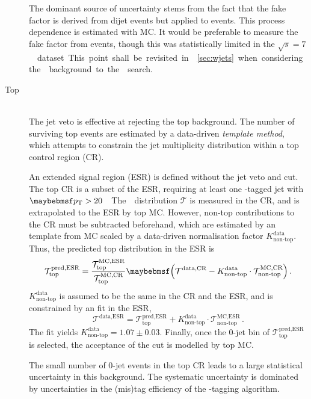 \begin{description}
	The dominant source of uncertainty stems from the fact that the fake factor is 
	derived from dijet events but applied to \Wjets events. This process dependence is 
	estimated with MC. It would be preferable to measure the fake factor from \Zjets 
	events, though this was statistically limited in the \unit{$\sqrt{s} = 7$}{\TeV} 
	dataset. This point shall be revisited in \Section~\ref{sec:wjets} when considering 
	the \Wjets background to the \HWW search.

\item[Top] \hfill \\
	The jet veto is effective at rejecting the top background. The number of surviving 
	top events are estimated by a data-driven \textit{template method}, which attempts to 
	constrain the jet multiplicity distribution within a top control region (CR).

	An extended signal region (ESR) is defined without the jet veto and \ptll cut. The 
	top CR is a subset of the ESR, requiring at least one \Pbottom-tagged jet with 
	\unit{$\pt > 20$}{\GeV}. The \njets distribution $\mathcal{T}$ is measured in the CR, 
	and is extrapolated to the ESR by top MC. However, non-top contributions to the CR 
	must be subtracted beforehand, which are estimated by an \njets template from MC 
	scaled by a data-driven normalisation factor $K_{\text{non-top}}^{\text{data}}$. 
	Thus, the predicted top \njets distribution in the ESR is
	\begin{equation}
		\mathcal{T}_{\text{top}}^{\text{pred,ESR}} = \frac{\mathcal{T}_{\text{top}}^{\text{MC,ESR}}}{\mathcal{T}_{\text{top}}^{\text{MC,CR}}} \parenths{\mathcal{T}^{\text{data,CR}} - K_{\text{non-top}}^{\text{data}} \cdot \mathcal{T}_{\text{non-top}}^{\text{MC,CR}}} \,.
	\end{equation}
	$K_{\text{non-top}}^{\text{data}}$ is assumed to be the same in the CR and the ESR, 
	and is constrained by an \njets fit in the ESR, \ie
	\begin{equation}
		\mathcal{T}^{\text{data,ESR}} = \mathcal{T}_{\text{top}}^{\text{pred,ESR}} + K_{\text{non-top}}^{\text{data}} \cdot \mathcal{T}_{\text{non-top}}^{\text{MC,ESR}} \,.
	\end{equation}
	The fit yields $K_{\text{non-top}}^{\text{data}} = 1.07 \pm 0.03$.
	Finally, once the 0-jet bin of $\mathcal{T}_{\text{top}}^{\text{pred,ESR}}$ is 
	selected, the acceptance of the \ptll cut is modelled by top MC.

	The small number of 0-jet events in the top CR leads to a large statistical 
	uncertainty in this background. The systematic uncertainty is dominated by 
	uncertainties in the (mis)tag efficiency of the \Pbottom-tagging algorithm.


\end{description}
